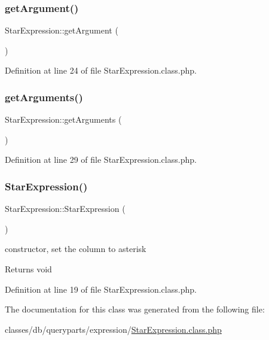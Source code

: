 \subsubsection{\texorpdfstring{get\+Argument()}{getArgument()}}
{\footnotesize\ttfamily Star\+Expression\+::get\+Argument (\begin{DoxyParamCaption}{ }\end{DoxyParamCaption})}



Definition at line 24 of file Star\+Expression.\+class.\+php.

\hypertarget{classStarExpression_ac356994bb75dacb90fd7ac6aa3dbb49c}{}\label{classStarExpression_ac356994bb75dacb90fd7ac6aa3dbb49c} 
\subsubsection{\texorpdfstring{get\+Arguments()}{getArguments()}}
{\footnotesize\ttfamily Star\+Expression\+::get\+Arguments (\begin{DoxyParamCaption}{ }\end{DoxyParamCaption})}



Definition at line 29 of file Star\+Expression.\+class.\+php.

\hypertarget{classStarExpression_a7c9d934f3e104f7987f4266ef9e28eff}{}\label{classStarExpression_a7c9d934f3e104f7987f4266ef9e28eff} 
\subsubsection{\texorpdfstring{Star\+Expression()}{StarExpression()}}
{\footnotesize\ttfamily Star\+Expression\+::\+Star\+Expression (\begin{DoxyParamCaption}{ }\end{DoxyParamCaption})}

constructor, set the column to asterisk \begin{DoxyReturn}{Returns}
void 
\end{DoxyReturn}


Definition at line 19 of file Star\+Expression.\+class.\+php.



The documentation for this class was generated from the following file\+:\begin{DoxyCompactItemize}
\item 
classes/db/queryparts/expression/\hyperlink{StarExpression_8class_8php}{Star\+Expression.\+class.\+php}\end{DoxyCompactItemize}
